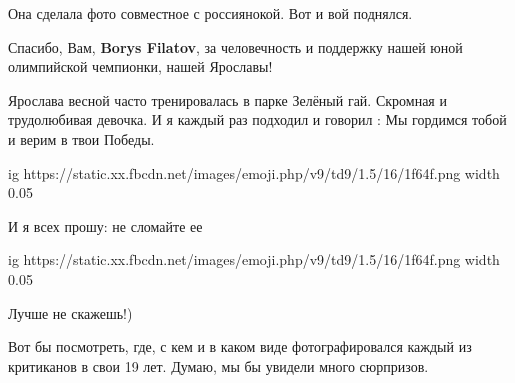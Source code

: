 \begin{itemize}
\begin{itemize}
Она сделала фото совместное с россиянокой. Вот и вой поднялся.
\end{itemize}

 
Спасибо, Вам, \textbf{Borys Filatov}, за человечность и поддержку нашей юной олимпийской чемпионки, нашей Ярославы!

 
Ярослава весной часто тренировалась в парке Зелёный гай. Скромная и
трудолюбивая девочка. И я каждый раз подходил и говорил : Мы гордимся тобой и
верим в твои Победы. 

\ifcmt
  ig https://static.xx.fbcdn.net/images/emoji.php/v9/td9/1.5/16/1f64f.png
  width 0.05
\fi

И я всех прошу: не сломайте ее

\ifcmt
  ig https://static.xx.fbcdn.net/images/emoji.php/v9/td9/1.5/16/1f64f.png
  width 0.05
\fi


 

Лучше не скажешь!)

 

Вот бы посмотреть, где, с кем и в каком виде фотографировался каждый из
критиканов в свои 19 лет. Думаю, мы бы увидели много сюрпризов.

\begin{itemize}
 

\end{itemize}
\end{itemize}
